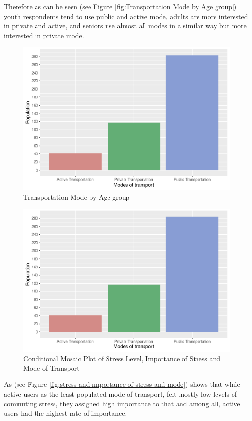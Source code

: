 \documentclass[
11pt, %
oneside, %
english, %
singlespacing, %
]{macthesis} %
\begin{document}
Therefore as can be seen (see Figure \ref{fig:Transportation Mode by Age group}) youth respondents tend to use public and active mode, adults are more interested in private and active, and seniors use almost all modes in a similar way but more interested in private mode.
\begin{figure}
\includegraphics[width=0.85\linewidth]{thesis_files/figure-latex/unnamed-chunk-22-1} \caption{\label{fig:Transportation Mode by Age group}Transportation Mode by Age group}\label{fig:unnamed-chunk-22}
\end{figure}
\begin{figure}

{\centering \includegraphics[width=0.85\linewidth]{thesis_files/figure-latex/unnamed-chunk-23-1} 

}

\caption{\label{fig:stress and importance of stress and mode}Conditional Mosaic Plot of Stress Level, Importance of Stress and Mode of Transport}\label{fig:unnamed-chunk-23}
\end{figure}
As (see Figure \ref{fig:stress and importance of stress and mode}) shows that while active users as the least populated mode of transport, felt mostly low levels of commuting stress, they assigned high importance to that and among all, active users had the highest rate of importance.
\end{document}
